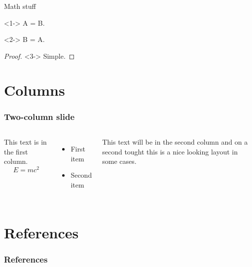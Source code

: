 \documentclass[mathserif]{beamer}
\begin{document}
\begin{frame}{Math stuff}
\begin{definition}<1->
A = B.
\end{definition}

\begin{theorem}<2->
B = A.
\end{theorem}

\begin{proof}<3->
Simple. 
\end{proof}
\end{frame}

\section{Columns}

\begin{frame}
\frametitle{Two-column slide}

\begin{columns}

This text is in the first column.
$$E=mc^2$$
\begin{itemize}
\item First item
\item Second item
\end{itemize}

This text will be in the second column
and on a second tought this is a nice looking
layout in some cases.
\end{columns}
\end{frame}

\section*{References}

\begin{frame}[allowframebreaks]
\frametitle{References}
    
    
\end{frame}
\end{document}
